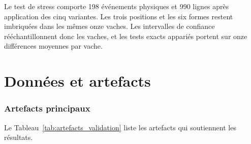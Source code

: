 Le test de stress comporte 198 événements physiques et 990 lignes après application des cinq
variantes. Les trois positions et les six formes restent imbriquées dans les mêmes onze
vaches. Les intervalles de confiance rééchantillonnent donc les vaches, et les tests exacts
appariés portent sur onze différences moyennes par vache.

\section{Données et artefacts}
\subsubsection{Artefacts principaux}
Le Tableau~\ref{tab:artefacts_validation} liste les artefacts qui soutiennent les résultats.

